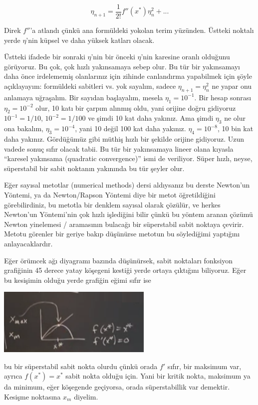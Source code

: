 \documentclass[12pt,fleqn]{article}\usepackage{../../common}
\begin{document}
$$ \eta_{n+1} =\frac{1}{2!} f''(x^\ast)\eta_n^2 + ... $$

Direk $f''$'a atlandı çünkü ana formüldeki yokolan terim yüzünden. Üstteki
noktalı yerde $\eta$'nin küpsel ve daha yüksek katları olacak.

Üstteki ifadede bir sonraki $\eta$'nin bir önceki $\eta$'nin karesine oranlı
olduğunu görüyoruz. Bu çok, çok hızlı yakınsamaya sebep olur. Bu tür bir
yakınsamayı daha önce irdelememiş olanlarınız için zihinde canlandırma
yapabilmek için şöyle açıklayayım: formüldeki sabitleri vs. yok sayalım, sadece
$\eta_{n+1} = \eta_n^2$ ne yapar onu anlamaya uğraşalım. Bir sayıdan başlayalım,
mesela $\eta_1 = 10^{-1}$. Bir hesap sonrası $\eta_2 = 10^{-2}$ olur, 10 katı bir
çarpım alınmış oldu, yani orijine doğru gidiyoruz $10^{-1} = 1/10$,
$10^{-2}=1/100$ ve şimdi 10 kat daha yakınız. Ama şimdi $\eta_3$ ne olur ona
bakalım, $\eta_3 = 10^{-4}$, yani 10 değil 100 kat daha yakınız. $\eta_4 =
10^{-8}$, 10 bin kat daha yakınız. Gördüğümüz gibi müthiş hızlı bir şekilde
orijine gidiyoruz. Uzun vadede sonuç sıfır olacak tabii. Bu tür bir yakınsamaya
lineer olana kıyasla ``karesel yakınsama (quadratic convergence)'' ismi de
veriliyor. Süper hızlı, neyse, süperstabil bir sabit noktanın yakınında bu tür
şeyler olur.

Eğer sayısal metotlar (numerical methods) dersi aldıysanız bu derste Newton'un
Yöntemi, ya da Newton/Rapson Yöntemi diye bir metot öğretildiğini
görebilirdiniz, bu metotla bir denklem sayısal olarak çözülür, ve herkes
Newton'un Yöntemi'nin çok hızlı işlediğini bilir çünkü bu yöntem aranan çözümü
Newton yinelemesi / aramasının bulacağı bir süperstabil sabit noktaya
çevirir. Metotu görenler bir geriye bakıp düşünürse metotun bu söylediğimi
yaptığını anlayacaklardır.

Eğer örümcek ağı diyagramı bazında düşünürsek, sabit noktaları fonksiyon
grafiğinin 45 derece yatay köşegeni kestiği yerde ortaya çıktığını
biliyoruz. Eğer bu kesişimin olduğu yerde grafiğin eğimi sıfır ise

\includegraphics[width=20em]{21_01.png}

bu bir süperstabil sabit nokta olurdu çünkü orada $f'$ sıfır, bir maksimum var,
ayrıca $f(x^\ast)=x^\ast$ sabit nokta olduğu için. Yani bir kritik nokta, maksimum ya
da minimum, eğer köşegende geçiyorsa, orada süperstabillik var demektir. Kesişme
noktasına $x_m$ diyelim. 
\end{document}
